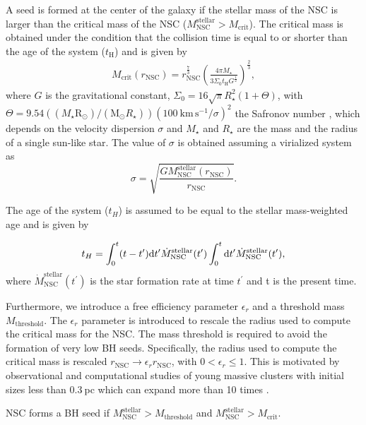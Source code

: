 \documentclass[baaa]{baaa}
\begin{document}
A  seed is formed at the center of the galaxy if the stellar mass of the NSC  is larger than the critical mass of the NSC ($M_\mathrm{NSC}^\mathrm{stellar} > M_\mathrm{crit}$). The critical mass is obtained under the condition that the collision time is equal to or shorter than the age of the system ($t_\mathrm{H}$) and  is given by  \citep{VERGARA2023}
\begin{eqnarray}
M_\mathrm{crit} (r_\mathrm{NSC}) = r_\mathrm{NSC}^\frac{7}{3}\left( \frac{4\pi M_\star}{3\Sigma_0 t_\mathrm{H}G^\frac{1}{2}}\right)^\frac{2}{3},
\end{eqnarray}
 where $G$ is the gravitational constant, $\Sigma_0=16\sqrt{\pi}R_\star^2(1+\Theta)$, with $\Theta=9.54((M_\star \mathrm{R}_\odot )/(\mathrm{M}_\odot R_\star ))( 100~\mathrm{km}\,\mathrm{s}^{-1} /\sigma)^2$  the Safronov number \citep{BINNEY2008}, which depends on the velocity dispersion $\sigma$ and $M_\star$ and  $R_\star$ are the mass and the radius of a single sun-like star. The value of $\sigma$ is obtained assuming a virialized system as 
\begin{equation}
\sigma= \sqrt{\frac{G M_\mathrm{NSC}^\mathrm{stellar}(r_\mathrm{NSC})}{r_\mathrm{NSC}}}.
\end{equation}

The age of the system ($t_H$) is assumed to be equal to the stellar mass-weighted age and is given by

\begin{equation}
t_H = \int_0^{t}(t-t^\prime){\rm d}t^\prime\dot{M}_\mathrm{NSC}^{\mathrm{stellar}}(t^\prime)\int_0^t{\rm d}t^\prime\dot{M}_\mathrm{NSC}^{\mathrm{stellar}}(t^\prime),
\end{equation}
where $\dot{M}_\mathrm{NSC}^{\mathrm{stellar}}(t^\prime)$ is the star formation rate at time $t^\prime$ and t is the present time.

Furthermore, we introduce a free efficiency parameter $\epsilon_r$  and a  threshold mass $M_\mathrm{threshold}$. The $\epsilon_r$  parameter is introduced to rescale the radius used to compute the critical mass for the NSC. The mass threshold is required to avoid the formation of very low BH seeds.  Specifically, the radius used to compute the critical mass is rescaled $r_\mathrm{NSC}\rightarrow \epsilon_r r_\mathrm{NSC}$, with $0<\epsilon_r\leq1$. This is motivated by observational and computational studies of young massive clusters with initial sizes less than $0.3~$pc which can expand more than 10 times \citep{KROUPA2017}.

NSC forms a BH seed if $M_\mathrm{NSC}^\mathrm{stellar}>M_\mathrm{threshold}$ and $M_\mathrm{NSC}^\mathrm{stellar} > M_\mathrm{crit}$.
\end{document}
